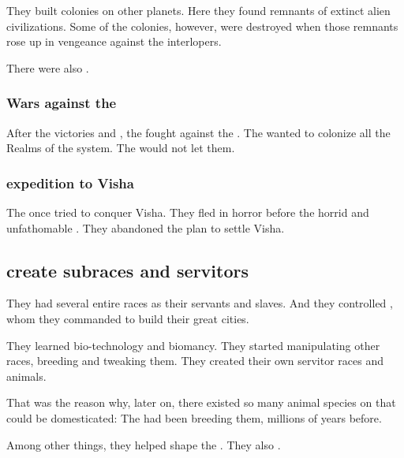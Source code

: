 They built colonies on other planets. 
Here they found remnants of extinct alien civilizations.
Some of the colonies, however, were destroyed when those remnants rose up in vengeance against the \Miithian interlopers.

There were also . 





\subsubsection{Wars against the \vorcanths}
After the victories  and , the \ophidians fought against the \vorcanths. 
The \ophidians wanted to colonize all the Realms of the system. 
The \vorcanths would not let them. 





\subsubsection{\Ophidian expedition to Visha}
The \ophidians once tried to conquer Visha.
They fled in horror before the horrid and unfathomable \moongods. 
They abandoned the plan to settle Visha. 









\subsection{\Ophidians create subraces and servitors}
They had several entire races as their servants and slaves. 
And they controlled \daemons{}, whom they commanded to build their great cities. 

They learned bio-technology and biomancy. 
They started manipulating other races, breeding and tweaking them. 
They created their own servitor races and animals. 

That was the reason why, later on, there existed so many animal species on \Miith{} that could be domesticated: 
The \ophidians{} had been breeding them, millions of years before. 

Among other things, they helped shape the . 
They also . 





